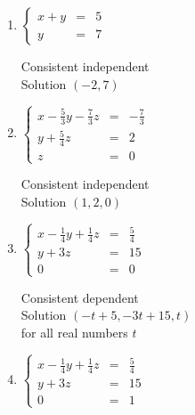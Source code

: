 \documentclass{ximera}
\begin{document}
\begin{enumerate}


\item $\left\{ \begin{array}{rcr} x + y & = & 5  \\ y & = & 7  \end{array} \right.$ 

Consistent independent\\
Solution $(-2, 7)$



\item $\left\{ \begin{array}{rcr} x - \frac{5}{3}y - \frac{7}{3}z & = & -\frac{7}{3} \\ [3pt] y + \frac{5}{4}z & = & 2 \\ z & = & 0  \end{array} \right.$

Consistent independent\\
Solution $(1, 2, 0)$



\item $\left\{ \begin{array}{rcr} x - \frac{1}{4}y + \frac{1}{4}z & = & \frac{5}{4} \\ [3pt] y + 3z & = & 15 \\ 0 & = & 0  \end{array} \right.$

Consistent dependent\\
Solution $(-t + 5, -3t + 15, t)$\\
for all real numbers $t$



\item $\left\{ \begin{array}{rcr} x - \frac{1}{4}y + \frac{1}{4}z & = & \frac{5}{4} \\ [3pt] y + 3z & = & 15 \\ 0 & = & 1 \end{array} \right.$


\end{enumerate}
\end{document}
